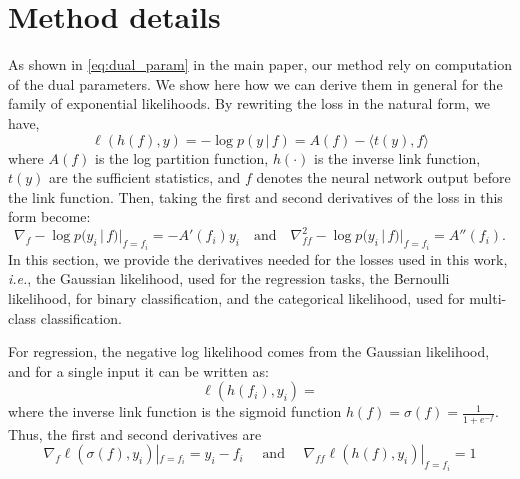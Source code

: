 \documentclass{article}
\makeatletter
\newcommand{\ie}{\textit{i.e.\@}\xspace}
\newcommand{\mbf}[1]{\mathbf{#1}}
\renewcommand{\mid}{\,|\,}
\newcommand{\vf}{\mbf{f}}
\newcommand{\vx}{\mbf{x}}
\newcommand{\vw}{\mbf{w}}
\newcommand{\Norm}{\mathcal{N}}
\makeatother
\begin{document}
\section{Method details}
\label{app:method}
%
As shown in \cref{eq:dual_param} in the main paper, our method rely on computation of the dual parameters. We show here how we can derive them in general for the family of exponential likelihoods. By rewriting the loss in the natural form, we have,
\begin{equation}
 \ell(h(f), y) = -\log p(y \mid f) =  A(f)  - \langle t(y), f \rangle
\end{equation}
where $A(f)$ is the log partition function, $h(\cdot)$ is the inverse link function, $t(y)$ are the sufficient statistics, and $f$ denotes the neural network output before the link function. 
Then, taking the first and second derivatives of the loss in this form become:
\begin{equation}\label{eq:dual_param_app}
  \nabla_{f} - \log p(y_i \mid f) |_{f=f_i} =  - A'(f_i) y_i
  \quad \text{and} \quad
  \nabla^2_{f\!f} - \log p(y_i \mid f) |_{f=f_i} = A''(f_i).
\end{equation}
In this section, we provide the derivatives needed for the losses used in this work, \ie, the Gaussian likelihood, used for the regression tasks, the Bernoulli likelihood, for binary classification, and the categorical likelihood, used for multi-class classification.

For regression, the negative log likelihood comes from the Gaussian likelihood, and for a single input it can be written as:
\begin{equation}
	\ell(h(f_i), y_i) = %
\end{equation}
where the inverse link function is the sigmoid function $h(f) = \sigma(f) = \frac{1}{1 + e^{-f}}$. Thus, the first and second derivatives are
\begin{equation}
	\nabla_f \ell(\sigma(f), y_i)|_{f=f_i} = y_i - f_i \quad \text{ and } \quad  \nabla_{f\!f} \ell(h(f), y_i)|_{f=f_i} = 1
\end{equation}



\end{document}
